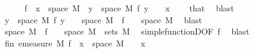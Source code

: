 \begin{isabellebody}
\ \ \ \ \isamarkupfalse%
\ {\isachardoublequoteopen}{\isacharparenleft}{\kern0pt}f\ {\isacharminus}{\kern0pt}{\isacharbackquote}{\kern0pt}\ {\isacharbraceleft}{\kern0pt}x{\isacharbraceright}{\kern0pt}\ {\isasyminter}\ space\ M{\isacharparenright}{\kern0pt}\ {\isasymsubseteq}\ {\isacharbraceleft}{\kern0pt}y\ {\isasymin}\ space\ M{\isachardot}{\kern0pt}\ f\ y\ {\isasymnoteq}\ {}{\isacharbraceright}{\kern0pt}{\isachardoublequoteclose}\ \ {\isachardoublequoteopen}x\ {\isasymnoteq}\ {}{\isachardoublequoteclose}\ \isamarkupfalse%
\ that\ \isamarkupfalse%
\ blast\isanewline
\ \ \ \ \isamarkupfalse%
\ \isamarkupfalse%
\ {\isachardoublequoteopen}{\isacharbraceleft}{\kern0pt}y\ {\isasymin}\ space\ M{\isachardot}{\kern0pt}\ f\ y\ {\isasymnoteq}\ {}{\isacharbraceright}{\kern0pt}\ {\isacharequal}{\kern0pt}\ space\ M\ {\isacharminus}{\kern0pt}\ {\isacharparenleft}{\kern0pt}f\ {\isacharminus}{\kern0pt}{\isacharbackquote}{\kern0pt}\ {\isacharbraceleft}{\kern0pt}{}{\isacharbraceright}{\kern0pt}\ {\isasyminter}\ space\ M{\isacharparenright}{\kern0pt}{\isachardoublequoteclose}\ \isamarkupfalse%
\ blast\isanewline
\ \ \ \ \isamarkupfalse%
\ \isamarkupfalse%
\ {\isachardoublequoteopen}space\ M\ {\isacharminus}{\kern0pt}\ {\isacharparenleft}{\kern0pt}f\ {\isacharminus}{\kern0pt}{\isacharbackquote}{\kern0pt}\ {\isacharbraceleft}{\kern0pt}{}{\isacharbraceright}{\kern0pt}\ {\isasyminter}\ space\ M{\isacharparenright}{\kern0pt}\ {\isasymin}\ sets\ M{\isachardoublequoteclose}\ \isamarkupfalse%
\ simple{\isacharunderscore}{\kern0pt}functionD{\isacharparenleft}{\kern0pt}{}{\isacharparenright}{\kern0pt}{\isacharbrackleft}{\kern0pt}OF\ f{\isacharparenleft}{\kern0pt}{}{\isacharparenright}{\kern0pt}{\isacharbrackright}{\kern0pt}\ \isamarkupfalse%
\ blast\isanewline
\ \ \ \ \isamarkupfalse%
\ \isamarkupfalse%
\ fin{\isacharunderscore}{\kern0pt}{}{\isacharcolon}{\kern0pt}\ {\isachardoublequoteopen}emeasure\ M\ {\isacharparenleft}{\kern0pt}f\ {\isacharminus}{\kern0pt}{\isacharbackquote}{\kern0pt}\ {\isacharbraceleft}{\kern0pt}x{\isacharbraceright}{\kern0pt}\ {\isasyminter}\ space\ M{\isacharparenright}{\kern0pt}\ {\isacharless}{\kern0pt}\ {\isasyminfinity}{\isachardoublequoteclose}\ \ {\isachardoublequoteopen}x\ {\isasymnoteq}\ {}{\isachardoublequoteclose}\ \isamarkupfalse%

\end{isabellebody}
